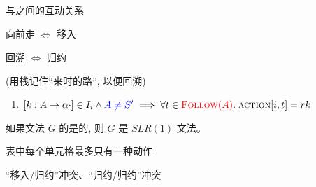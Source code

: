 \begin{frame}{}
  \begin{center}
    与之间的互动关系

    \vspace{0.80cm}
    向前走 $\Leftrightarrow$ 移入

    \vspace{0.50cm}
    回溯   $\Leftrightarrow$ 归约

    \vspace{1.00cm}

    \vspace{0.20cm}
    (用栈记住``来时的路'', 以便回溯)
  \end{center}
\end{frame}

\begin{frame}{}
  \begin{center}


    \begin{enumerate}[(3)]
      \centering
      \item $[k: A \to \alpha \cdot] \in I_{i} \land \textcolor{blue}{A \neq S'} \implies
        \forall t \in \textcolor{red}{\textsc{Follow}(A)}.\; \textsc{action}[i, t] = rk$
    \end{enumerate}
  \end{center}
\end{frame}

\begin{frame}{}
  \begin{definition}[$SLR(1)$文法]
    如果文法 $G$ 的是的,
    则 $G$ 是 $SLR(1)$ 文法。
  \end{definition}

  \vspace{0.30cm}
  \begin{center}
     \action{}表中每个单元格最多只有一种动作 \\[8pt]


     ``移入/归约''冲突、``归约/归约''冲突
  \end{center}
\end{frame}

